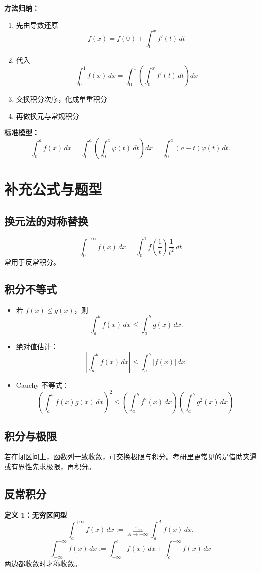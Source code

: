 \documentclass[12pt,a4paper]{ctexart}
\begin{document}
\textbf{方法归纳：}
\begin{enumerate}
  \item 先由导数还原
  \[
  f(x)=f(0)+\int_0^x f'(t)\,dt
  \]
  \item 代入
  \[
  \int_0^1 f(x)\,dx
  =
  \int_0^1\left(\int_0^x f'(t)\,dt\right)dx
  \]
  \item 交换积分次序，化成单重积分
  \item 再做换元与常规积分
\end{enumerate}

\textbf{标准模型：}
\[
\int_0^a f(x)\,dx
=
\int_0^a \left(\int_0^x \varphi(t)\,dt\right)dx
=
\int_0^a (a-t)\varphi(t)\,dt.
\]

\section{补充公式与题型}

\subsection{换元法的对称替换}
\[
\int_0^{+\infty} f(x)\,dx
=
\int_0^1 f\left(\frac1t\right)\frac1{t^2}\,dt
\]
常用于反常积分。

\subsection{积分不等式}
\begin{itemize}
  \item 若 $f(x)\le g(x)$，则
  \[
  \int_a^b f(x)\,dx\le \int_a^b g(x)\,dx.
  \]
  \item 绝对值估计：
  \[
  \left|\int_a^b f(x)\,dx\right|\le \int_a^b |f(x)|\,dx.
  \]
  \item Cauchy 不等式：
  \[
  \left(\int_a^b f(x)g(x)\,dx\right)^2
  \le
  \left(\int_a^b f^2(x)\,dx\right)\left(\int_a^b g^2(x)\,dx\right).
  \]
\end{itemize}

\subsection{积分与极限}
若在闭区间上，函数列一致收敛，可交换极限与积分。考研里更常见的是借助夹逼或有界性先求极限，再积分。

\subsection{反常积分}
\textbf{定义 1：无穷区间型}
\[
\int_a^{+\infty} f(x)\,dx:=\lim_{A\to+\infty}\int_a^A f(x)\,dx.
\]
\[
\int_{-\infty}^{+\infty} f(x)\,dx
:=
\int_{-\infty}^c f(x)\,dx+\int_c^{+\infty}f(x)\,dx
\]
两边都收敛时才称收敛。
\end{document}
